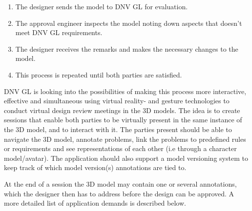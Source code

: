 \documentclass[UKenglish]{ifimaster}
\begin{document}
\begin{enumerate}
	\item The designer sends the model to DNV GL for evaluation.
	\item The approval engineer inspects the model noting down aspects that doesn't meet DNV GL requirements.
	\item The designer receives the remarks and makes the necessary changes to the model.
	\item This process is repeated until both parties are satisfied.
\end{enumerate}

DNV GL is looking into the possibilities of making this process more interactive, effective and simultaneous using virtual reality- and gesture technologies to conduct virtual design review meetings in the 3D models. The idea is to create sessions that enable both parties to be virtually present in the same instance of the 3D model, and to interact with it. The parties present should be able to navigate the 3D model, annotate problems, link the problems to predefined rules or requirements and see representations of each other (i.e through a character model/avatar). The application should also support a model versioning system to keep track of which model version(s) annotations are tied to.

At the end of a session the 3D model may contain one or several annotations, which the designer then has to address before the design can be approved. A more detailed list of application demands is described below.
\end{document}
